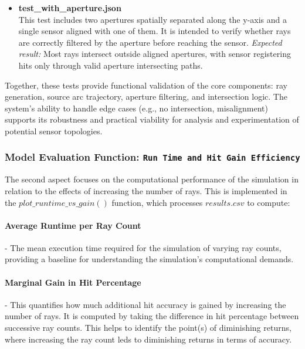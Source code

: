 \begin{itemize}
    \item \textbf{test\_with\_aperture.json} \\
    This test includes two apertures spatially separated along the y-axis and a single sensor aligned with one of them. It is intended to verify whether rays are correctly filtered by the aperture before reaching the sensor. \textit{Expected result:} Most rays intersect outside aligned apertures, with sensor registering hits only through valid aperture intersecting paths.

\end{itemize}

Together, these tests provide functional validation of the core components: ray generation, source arc trajectory, aperture filtering, and intersection logic. The system’s ability to handle edge cases (e.g., no intersection, misalignment) supports its robustness and practical viability for analysis and experimentation of potential sensor topologies.

\subsubsection{Model Evaluation Function: \texttt{Run Time and Hit Gain Efficiency}}

The second aspect focuses on the computational performance of the simulation in relation to the effects of increasing the number of rays.
This is implemented in the $plot\_runtime\_vs\_gain()$ function, which processes $results.csv$ to compute:

\paragraph{\textbf{Average Runtime per Ray Count}}

- The mean execution time required for the simulation of varying ray counts, providing a baseline for understanding the simulation's computational demands.

\paragraph{\textbf{Marginal Gain in Hit Percentage}}
- This quantifies how much additional hit accuracy is gained by increasing the number of rays. It is computed by taking the difference in hit percentage between successive ray counts. This helps to identify the point(s) of diminishing returns, where increasing the ray count leds to diminishing returns in terms of accuracy.

